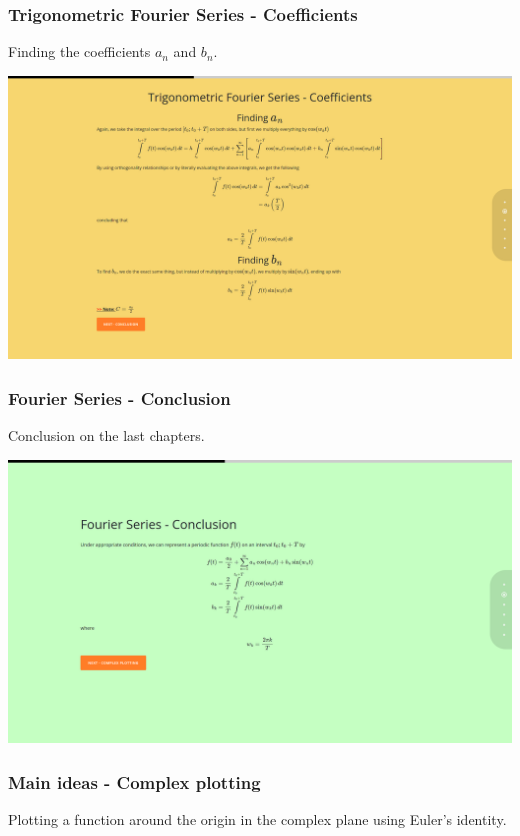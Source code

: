 \documentclass{article}
\begin{document}
\subsubsection{Trigonometric Fourier Series - Coefficients}

Finding the coefficients \(a_n\) and \(b_n\).

\includegraphics[width=\textwidth]{chap7.png}

\subsubsection{Fourier Series - Conclusion}

Conclusion on the last chapters.

\includegraphics[width=\textwidth]{chap8.png}

\subsubsection{Main ideas - Complex plotting}

Plotting a function around the origin in the complex plane using Euler's identity.
\end{document}

